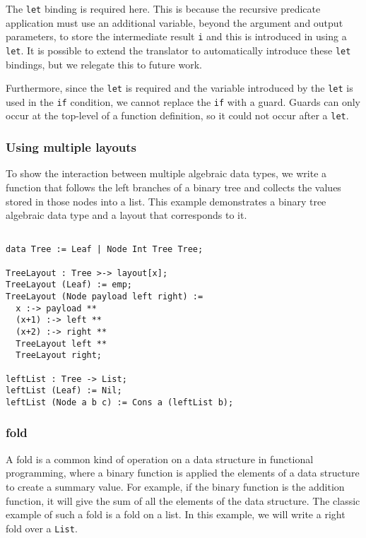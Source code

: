 \noindent
The \verb|let| binding is required here. This is because the recursive predicate
application must use an additional variable, beyond the argument and output
parameters, to store the intermediate result \verb|i| and this is introduced in
\Pika{} using a \verb|let|. It is possible to extend the translator to
automatically introduce these \verb|let| bindings, but we relegate this to future work.

Furthermore, since the \verb|let| is required and the variable introduced by the \verb|let| is used
in the \verb|if| condition, we cannot replace the \verb|if| with a guard. Guards can only occur
at the top-level of a function definition, so it could not occur after a \verb|let|.

\subsubsection{Using multiple layouts}

To show the interaction between multiple algebraic data types, we write a
function that follows the left branches of a binary tree and collects the values
stored in those nodes into a list. This example demonstrates a binary tree
algebraic data type and a layout that corresponds to it.

\begin{lstlisting}[language=Pika]
%generate leftList [TreeLayout] Sll

data Tree := Leaf | Node Int Tree Tree;

TreeLayout : Tree >-> layout[x];
TreeLayout (Leaf) := emp;
TreeLayout (Node payload left right) :=
  x :-> payload **
  (x+1) :-> left **
  (x+2) :-> right **
  TreeLayout left **
  TreeLayout right;

leftList : Tree -> List;
leftList (Leaf) := Nil;
leftList (Node a b c) := Cons a (leftList b);
\end{lstlisting}


\subsubsection{fold}
\label{sec:examples-fold}

A fold is a common kind of operation on a data structure in functional programming, where a binary function
is applied the elements of a data structure to create a summary value. For example, if the binary function
is the addition function, it will give the sum of all the elements of the data structure. The
classic example of such a fold is a fold on a list. In this example, we will write a
right fold over a \verb|List|.

